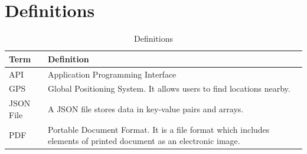 \section{Definitions}
\begin{center}
    \begin{table}[H]
        \begin{tabular}{| m{3cm}| m{10cm} |}
            \hline
            \textbf{Term} & \textbf{Definition} \\
            \hline
            API & Application Programming Interface \\
            \hline
            GPS & Global Positioning System. It allows users to find locations nearby. \\
            \hline
            JSON File & A JSON file stores data in key-value pairs and arrays. \\
            \hline
            PDF & Portable Document Format. It is a file format which includes elements of printed document as an electronic image.\\
            \hline
        \end{tabular}
        \caption[Definitions]{Definitions}
    \end{table}
\end{center}